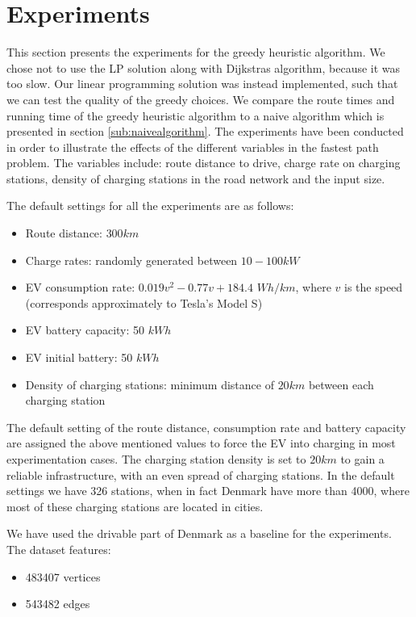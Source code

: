 \section{Experiments}
\label{sec:experiments}
This section presents the experiments for the greedy heuristic algorithm. We chose not to use the LP solution along with Dijkstras algorithm, because it was too slow. Our linear programming solution was instead implemented, such that we can test the quality of the greedy choices. We compare the route times and running time of the greedy heuristic algorithm to a naive algorithm which is presented in section \ref{sub:naivealgorithm}. The experiments have been conducted in order to illustrate the effects of the different variables in the fastest path problem. The variables include: route distance to drive, charge rate on charging stations, density of charging stations in the road network and the input size.

The default settings for all the experiments are as follows:
\begin{itemize}
     \item Route distance: $300 \si{km}$
     \item Charge rates: randomly generated between $10-100 \si{kW}$
     \item EV consumption rate: $0.019v^2-0.77v+184.4$ $\si{Wh\per km}$, where $v$ is the speed (corresponds approximately to Tesla's Model S\cite{teslacon})
     \item EV battery capacity: 50 $\si{kWh}$
	 \item EV initial battery: 50 $\si{kWh}$
     \item Density of charging stations: minimum distance of $20 \si{km}$ between each charging station
 \end{itemize} 

The default setting of the route distance, consumption rate and battery capacity are assigned the above mentioned values to force the EV into charging in most experimentation cases. The charging station density is set to $20 \si{km}$ to gain a reliable infrastructure, with an even spread of charging stations. In the default settings we have 326 stations, when in fact Denmark have more than 4000\cite{Globalevoutlook}, where most of these charging stations are located in cities.

We have used the drivable part of Denmark as a baseline for the experiments. The dataset features:
\begin{itemize}
    \item 483407 vertices
    \item 543482 edges
\end{itemize}

